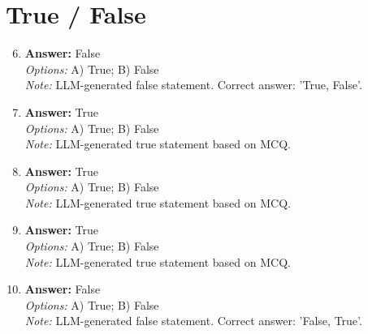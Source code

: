 \documentclass[12pt]{article}
\begin{document}
\section*{True / False}
\begin{enumerate}[label=\arabic*.]
\setcounter{enumi}{5}
\item \textbf{Answer:} False
\\ \textit{Options:} A) True; B) False
\\ \textit{Note:} LLM-generated false statement. Correct answer: 'True, False'.
\item \textbf{Answer:} True
\\ \textit{Options:} A) True; B) False
\\ \textit{Note:} LLM-generated true statement based on MCQ.
\item \textbf{Answer:} True
\\ \textit{Options:} A) True; B) False
\\ \textit{Note:} LLM-generated true statement based on MCQ.
\item \textbf{Answer:} True
\\ \textit{Options:} A) True; B) False
\\ \textit{Note:} LLM-generated true statement based on MCQ.
\item \textbf{Answer:} False
\\ \textit{Options:} A) True; B) False
\\ \textit{Note:} LLM-generated false statement. Correct answer: 'False, True'.
\end{enumerate}
\end{document}
